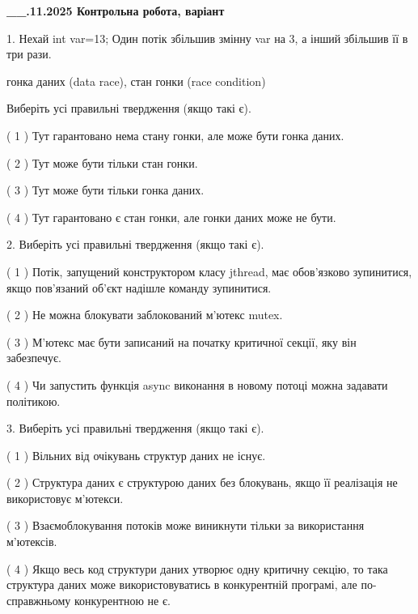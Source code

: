 \documentclass[12pt, ukrainian]{article}
\begin{document}
\newpage
\begin {large}

\textbf{\_\_.11.2025 Контрольна робота, варіант  }\par


{
1. Нехай int var=13; Один потік збільшив змінну var на 3, а інший збільшив її в три рази.

гонка даних (data race), стан гонки (race condition)

Виберіть усі правильні твердження (якщо такі є).\par
\vspace{2mm}
( 1 ) Тут гарантовано нема стану гонки, але може бути гонка даних.%

( 2 ) Тут може бути тільки стан гонки.%

( 3 ) Тут може бути тільки гонка даних.%

( 4 ) Тут гарантовано є стан гонки, але гонки даних може не бути.%


2. Виберіть усі правильні твердження (якщо такі є).\par
\vspace{2mm}

( 1 ) Потік, запущений конструктором класу jthread, має обов’язково зупинитися, якщо пов’язаний об’єкт надішле команду зупинитися.%

( 2 ) Не можна блокувати заблокований м’ютекс mutex.%

( 3 ) М’ютекс має бути записаний на початку критичної секції, яку він забезпечує.%

( 4 ) Чи запустить функція  async виконання в новому потоці можна задавати політикою.%


3. Виберіть усі правильні твердження (якщо такі є).\par
\vspace{2mm}

( 1 ) Вільних від очікувань структур даних не існує.%

( 2 ) Структура даних є структурою даних без блокувань, якщо її реалізація не використовує м’ютекси.%

( 3 ) Взаємоблокування потоків може виникнути тільки за використання м’ютексів.%

( 4 ) Якщо весь код структури даних утворює одну критичну секцію, то така структура даних може використовуватись в конкурентній програмі, але по-справжньо\-му конкурентною не є.%


}
\end{large}
\end{document}
